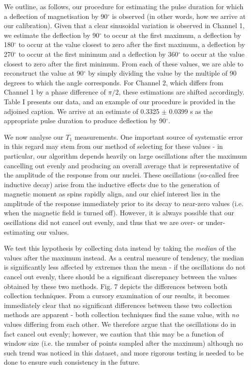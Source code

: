 \documentclass[aps,prl,nofootinbib,twocolumn,superscriptaddress,groupedaddress]{revtex4}  %
\begin{document}
We outline, as follows, our procedure for estimating the pulse duration for which a deflection of magnetisation by 90$^{\circ}$ is observed (in other words, how we arrive at our calibration). Given that a clear sinusoidal variation is observed in Channel 1, we estimate the deflection by 90$^{\circ}$ to occur at the first maximum, a deflection by 180$^{\circ}$ to occur at the value closest to zero after the first maximum, a deflection by 270$^{\circ}$ to occur at the first minimum and a deflection by 360$^{\circ}$ to occur at the value closest to zero after the first minimum. From each of these values, we are able to reconstruct the value at 90$^{\circ}$ by simply dividing the value by the multiple of 90 degrees to which the angle corresponds. For Channel 2, which differs from Channel 1 by a phase difference of $\pi/2$, these estimations are shifted accordingly. Table I presents our data, and an example of our procedure is provided in the adjoined caption. We arrive at an estimate of 0.3325 $\pm$ 0.0399 s as the appropriate pulse duration to produce deflection by 90$^{\circ}$.

We now analyse our $T_{1}$ measurements. One important source of systematic error in this regard may stem from our method of selecting for these values - in particular, our algorithm depends heavily on large oscillations after the maximum cancelling out evenly and producing an overall average that is representative of the amplitude of the response from our nuclei. These oscillations (so-called free inductive decay) arise from the inductive effects due to the generation of magnetic moment as spins rapidly align, and our chief interest lies in the amplitude of the response immediately prior to its decay to near-zero values (i.e. when the magnetic field is turned off). However, it is always possible that our oscillations did not cancel out evenly, and thus that we are over- or under-estimating our values.

We test this hypothesis by collecting data instead by taking the \textit{median} of the values after the maximum instead. As a central measure of tendency, the median is significantly less affected by extremes than the mean - if the oscillations do not cancel out evenly, there should be a significant discrepancy between the values obtained by these two methods. Fig. 7 depicts the differences between both collection techniques. From a cursory examination of our results, it becomes immediately clear that no significant differences between these two collection methods are apparent - both collection techniques find the same value, with \textit{no} values differing from each other. We therefore argue that the oscillations do in fact cancel out evenly; however, we caution that this may be a function of window size (i.e. the number of points sampled after the maximum) although no such trend was noticed in this dataset, and more rigorous testing is needed to be done to ensure such consistency in the future.
\end{document}
